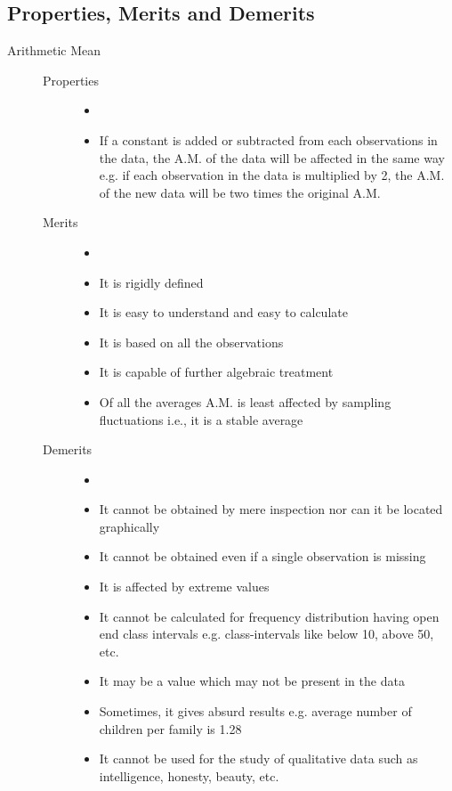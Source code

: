 \documentclass[
10pt, %
a4paper, %
]{report}
\begin{document}
\subsection*{Properties, Merits and Demerits}
\begin{description}
\item[Arithmetic Mean]
\begin{description}
\item[]
\item[Properties]
\begin{itemize}
\item[]
\item If a constant is added or subtracted from each observations in the data, the A.M. of the data will be affected in the same way e.g. if each observation in the data is multiplied by 2, the A.M. of the new data will be two times the original A.M.
\end{itemize}
\item[Merits]
\begin{itemize}
\item[]
\item It is rigidly defined
\item It is easy to understand and easy to calculate
\item It is based on all the observations
\item It is capable of further algebraic treatment
\item Of all the averages A.M. is least affected by sampling fluctuations i.e., it is a stable average
\end{itemize}
\item[Demerits]
\begin{itemize}
\item[]
\item It cannot be obtained by mere inspection nor can it be located graphically
\item It cannot be obtained even if a single observation is missing
\item It is affected by extreme values
\item It cannot be calculated for frequency distribution having open end class intervals e.g. class-intervals like below 10, above 50, etc.
\item It may be a value which may not be present in the data
\item Sometimes, it gives absurd results e.g. average number of children per family is 1.28
\item It cannot be used for the study of qualitative data such as intelligence, honesty, beauty, etc.

\end{itemize}
\end{description}
\end{description}
\end{document}
